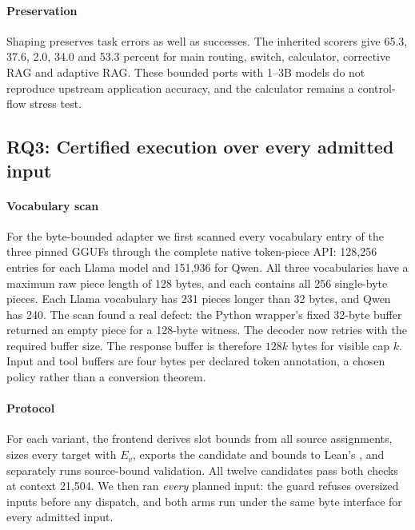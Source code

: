 \paragraph{Preservation}
Shaping preserves task errors as well as successes. The inherited scorers give
65.3, 37.6, 2.0, 34.0 and 53.3 percent for main routing, switch, calculator,
corrective RAG and adaptive RAG. These bounded ports with 1--3B models do not
reproduce upstream application accuracy, and the calculator remains a
control-flow stress test.

\subsection{RQ3: Certified execution over every admitted input}\label{sec:cert-study}

\paragraph{Vocabulary scan}
For the byte-bounded adapter we first scanned every vocabulary entry of the three
pinned GGUFs through the complete native token-piece API: 128,256 entries for each
Llama model and 151,936 for Qwen. All three vocabularies have a maximum raw piece
length of 128 bytes, and each contains all 256 single-byte pieces. Each Llama
vocabulary has 231 pieces longer than 32 bytes, and Qwen has 240. The scan found
a real defect: the Python wrapper's fixed 32-byte buffer returned an empty piece
for a 128-byte witness. The decoder now retries with the required buffer size.
The response buffer is therefore $128k$ bytes for visible cap $k$. Input and tool
buffers are four bytes per declared token annotation, a chosen policy rather than
a conversion theorem.

\paragraph{Protocol}
For each variant, the frontend derives slot bounds from all source assignments,
sizes every target with $E_v$, exports the candidate and bounds to Lean's
, and separately runs source-bound validation. All twelve
candidates pass both checks at context 21,504. We then ran \emph{every} planned
input: the guard refuses oversized inputs before any dispatch, and both arms run
under the same byte interface for every admitted input.

